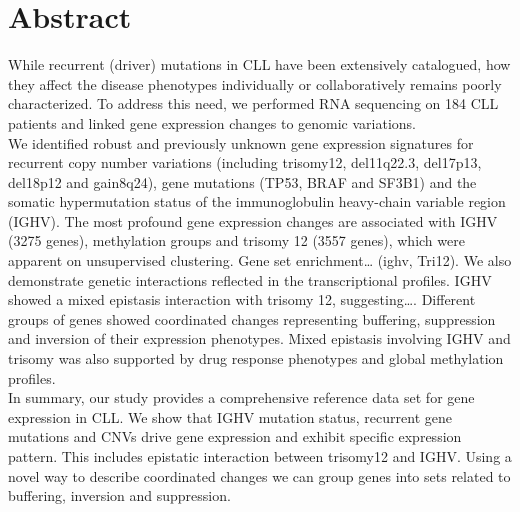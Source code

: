 
\section{Abstract}

While recurrent (driver) mutations in CLL have been extensively catalogued, how they affect the disease phenotypes individually or collaboratively remains poorly characterized. To address this need, we performed RNA sequencing on 184 CLL patients and linked gene expression changes to genomic variations. \\

We identified robust and previously unknown gene expression signatures for recurrent copy number variations (including trisomy12, del11q22.3, del17p13, del18p12 and gain8q24), gene mutations (TP53, BRAF and SF3B1) and the somatic hypermutation status of the immunoglobulin heavy-chain variable region (IGHV). The most profound gene expression changes are associated with IGHV (3275 genes), methylation groups and trisomy 12 (3557 genes), which were apparent on unsupervised clustering. Gene set enrichment… (ighv, Tri12). We also demonstrate genetic interactions reflected in the transcriptional profiles. IGHV showed a mixed epistasis interaction with trisomy 12, suggesting…. Different groups of genes showed coordinated changes representing buffering, suppression and inversion of their expression phenotypes. Mixed epistasis involving IGHV and trisomy was also supported by drug response phenotypes and global methylation profiles. \\

In summary, our study provides a comprehensive reference data set for gene expression in CLL. We show that IGHV mutation status, recurrent gene mutations and CNVs drive gene expression and exhibit specific expression pattern. This includes epistatic interaction between trisomy12 and IGHV. Using a novel way to describe coordinated changes we can group genes into sets related to buffering, inversion and suppression.